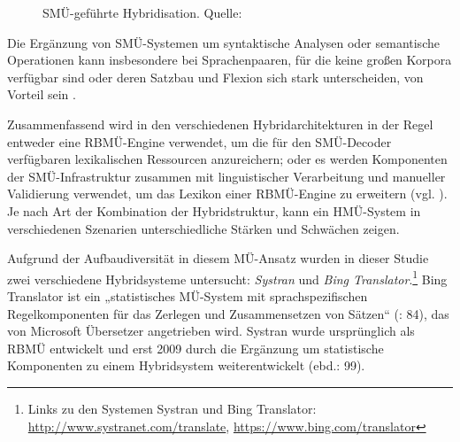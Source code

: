 \begin{figure}
\caption{SMÜ-geführte Hybridisation. Quelle: \citealt{Costa-JussàFonollosa2015}}
\label{fig:3:4}
\end{figure}


Die Ergänzung von SMÜ-Systemen um syntaktische Analysen oder semantische Operationen kann insbesondere bei Sprachenpaaren, für die keine großen Korpora verfügbar sind oder deren Satzbau und Flexion sich stark unterscheiden, von Vorteil sein \citep{Stein2009}.

Zusammenfassend wird in den verschiedenen Hybridarchitekturen in der Regel entweder eine RBMÜ-Engine verwendet, um die für den SMÜ-Decoder verfügbaren lexikalischen Ressourcen anzureichern; oder es werden Komponenten der SMÜ-Infrastruktur zusammen mit linguistischer Verarbeitung und manueller Validierung verwendet, um das Lexikon einer RBMÜ-Engine zu erweitern (vgl. \citealt{EiseleEtAl2008}). Je nach Art der Kombination der Hybridstruktur, kann ein HMÜ-System in verschiedenen Szenarien unterschiedliche Stärken und Schwächen zeigen.

Aufgrund der Aufbaudiversität in diesem MÜ-Ansatz wurden in dieser Studie zwei verschiedene Hybridsysteme untersucht: \textit{Systran} und \textit{Bing Translator}.\footnote{Links zu den Systemen Systran und Bing Translator:
\url{http://www.systranet.com/translate},
\url{https://www.bing.com/translator}
}
Bing Translator ist ein „statistisches MÜ-System mit sprachspezifischen Regelkomponenten für das Zerlegen und Zusammensetzen von Sätzen“ (\citealt{WerthmannWitt2014}: 84), das von Microsoft Übersetzer angetrieben wird. Systran wurde ursprünglich als RBMÜ entwickelt und erst 2009 durch die Ergänzung um statistische Komponenten zu einem Hybridsystem weiterentwickelt (ebd.: 99).

